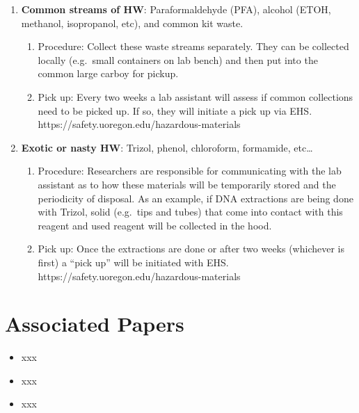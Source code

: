 \documentclass[
  letterpaper,
  DIV=11,
  numbers=noendperiod]{scrreprt}
\providecommand{\tightlist}{%
  \setlength{\itemsep}{0pt}\setlength{\parskip}{0pt}}\usepackage{longtable,booktabs,array}
\begin{document}
\begin{enumerate}
\def\labelenumi{\arabic{enumi}.}
\tightlist
\item
  \textbf{Common streams of HW}: Paraformaldehyde (PFA), alcohol (ETOH,
  methanol, isopropanol, etc), and common kit waste.

  \begin{enumerate}
  \def\labelenumii{\arabic{enumii}.}
  \tightlist
  \item
    Procedure: Collect these waste streams separately. They can be
    collected locally (e.g.~small containers on lab bench) and then put
    into the common large carboy for pickup.
  \item
    Pick up: Every two weeks a lab assistant will assess if common
    collections need to be picked up. If so, they will initiate a pick
    up via EHS. https://safety.uoregon.edu/hazardous-materials
  \end{enumerate}
\item
  \textbf{Exotic or nasty HW}: Trizol, phenol, chloroform, formamide,
  etc\ldots{}

  \begin{enumerate}
  \def\labelenumii{\arabic{enumii}.}
  \tightlist
  \item
    Procedure: Researchers are responsible for communicating with the
    lab assistant as to how these materials will be temporarily stored
    and the periodicity of disposal. As an example, if DNA extractions
    are being done with Trizol, solid (e.g.~tips and tubes) that come
    into contact with this reagent and used reagent will be collected in
    the hood.
  \item
    Pick up: Once the extractions are done or after two weeks (whichever
    is first) a ``pick up'' will be initiated with EHS.
    https://safety.uoregon.edu/hazardous-materials
  \end{enumerate}
\end{enumerate}

\hypertarget{associated-papers-3}{%
\section{Associated Papers}\label{associated-papers-3}}

\begin{itemize}
\tightlist
\item
  xxx
\item
  xxx
\item
  xxx
\end{itemize}
\end{document}
